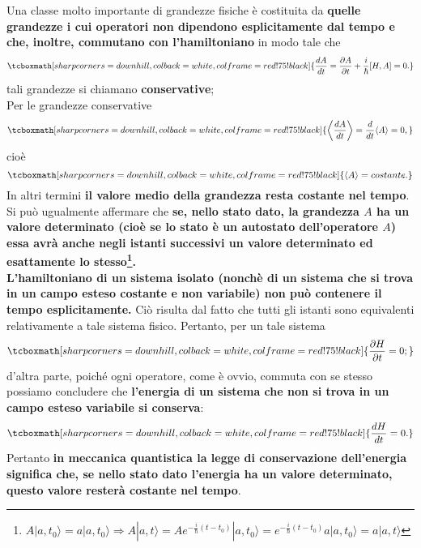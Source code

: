 Una classe molto importante di grandezze fisiche è costituita da \textbf{quelle grandezze i cui operatori non dipendono esplicitamente dal tempo e che, inoltre, commutano con l'hamiltoniano} in modo tale che 
	\begin{equation}
		\tcboxmath[sharp corners=downhill, colback=white, colframe=red!75!black]{
			\frac{dA}{dt}= \frac{\partial A}{\partial{t}} + \frac{i}{\hbar}[H,A]=0.
			}
	\end{equation}
tali grandezze si chiamano \textbf{conservative};\\

Per le grandezze conservative 
	\begin{equation} 
		\tcboxmath[sharp corners=downhill, colback=white, colframe=red!75!black]{
			\left\langle \frac{dA}{dt}\right\rangle= \frac{d}{dt}\langle A \rangle =0,
			}
	\end{equation}
cioè 
	\begin{equation}
		\tcboxmath[sharp corners=downhill, colback=white, colframe=red!75!black]{
			\langle A \rangle= costante.
			}
	\end{equation}
In altri termini \textbf{il valore medio della grandezza resta costante nel tempo}. Si può ugualmente affermare che \textbf{se, nello stato dato, la grandezza $A$ ha un valore determinato (cioè se lo stato è un autostato dell'operatore $A$) essa avrà anche negli istanti successivi un valore determinato ed esattamente lo stesso\footnote{$A| a, t_0\rangle= a |a,t_0\rangle \Rightarrow A|a, t \rangle = Ae^{-\frac{i}{\hbar}(t-t_0)}|a,t_0\rangle=e^{-\frac{i}{\hbar}(t-t_0)}a|a,t_0\rangle=a|a,t\rangle$}.}\\

\textbf{L'hamiltoniano di un sistema isolato (nonchè di un sistema che si trova in un campo esteso costante e non variabile) non può contenere il tempo esplicitamente.} Ciò risulta dal fatto che tutti gli istanti sono equivalenti relativamente a tale sistema fisico. Pertanto, per un tale sistema  
	\begin{equation}
		\tcboxmath[sharp corners=downhill, colback=white, colframe=red!75!black]{
			\frac{\partial H}{\partial{t}}=0;
			}
	\end{equation}
d'altra parte, poiché ogni operatore, come è ovvio, commuta con se stesso possiamo concludere che \textbf{l'energia di un sistema che non si trova in un campo esteso variabile si conserva}:
	\begin{equation}
		\tcboxmath[sharp corners=downhill, colback=white, colframe=red!75!black]{
			\frac{dH}{dt}=0.
			}
	\end{equation}
Pertanto \textbf{in meccanica quantistica la legge di conservazione dell'energia significa che, se nello stato dato l'energia ha un valore determinato, questo valore resterà costante nel tempo}.


